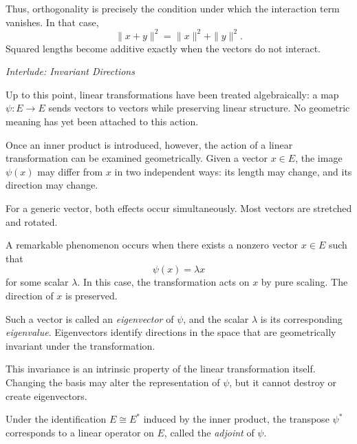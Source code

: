 Thus, orthogonality is precisely the condition under which the interaction term
vanishes.
In that case,
\[
\|x+y\|^2 = \|x\|^2 + \|y\|^2.
\]
Squared lengths become additive exactly when the vectors do not interact.

\medskip


\textit{Interlude: Invariant Directions}

Up to this point, linear transformations have been treated algebraically:
a map $\psi : E \to E$ sends vectors to vectors while preserving linear
structure.
No geometric meaning has yet been attached to this action.

\medskip

Once an inner product is introduced, however, the action of a linear
transformation can be examined geometrically.
Given a vector $x \in E$, the image $\psi(x)$ may differ from $x$ in two
independent ways: its length may change, and its direction may change.

\medskip

For a generic vector, both effects occur simultaneously.
Most vectors are stretched and rotated.

\medskip

A remarkable phenomenon occurs when there exists a nonzero vector $x \in E$
such that
\[
\psi(x) = \lambda x
\]
for some scalar $\lambda$.
In this case, the transformation acts on $x$ by pure scaling.
The direction of $x$ is preserved.

\medskip

Such a vector is called an \emph{eigenvector} of $\psi$, and the scalar
$\lambda$ is its corresponding \emph{eigenvalue}.
Eigenvectors identify directions in the space that are geometrically invariant
under the transformation.

\medskip

This invariance is an intrinsic property of the linear transformation itself.
Changing the basis may alter the representation of $\psi$, but it cannot
destroy or create eigenvectors.

\medskip

Under the identification $E \cong E^*$ induced by the inner product, the
transpose $\psi^*$ corresponds to a linear operator on $E$, called the
\emph{adjoint} of $\psi$.

